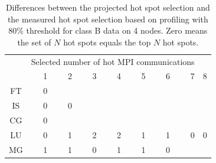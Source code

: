 \begin{table}
\begin{center}
\begin{tabular}{c|r|r|r|r|r|r|r|r}
\hline
&\multicolumn{7}{c}{Selected number of hot MPI communications}\\
        & 1 & 2 & 3 & 4 & 5 & 6 & 7 & 8 \\
\hline
FT      & 0 &   &   &   &   &   &   &   \\  %
IS      & 0 & 0 &   &   &   &   &   &   \\  %
CG      & 0 &   &   &   &   &   &   &   \\  %
LU      & 0 & 1 & 2 & 2 & 1 & 1 & 0 & 0 \\  %
MG      & 1 & 1 & 0 & 1 & 1 & 0 &   &   \\  %
\hline
\hline
\end{tabular}
\end{center}
\caption{
Differences between the projected hot spot selection and
the measured hot spot selection based on profiling with 80\% threshold for class B data on 4 nodes. Zero means
the set of $N$ hot spots equals the top $N$ hot spots.
}%
\label{tab:npb:hot}
\end{table}


